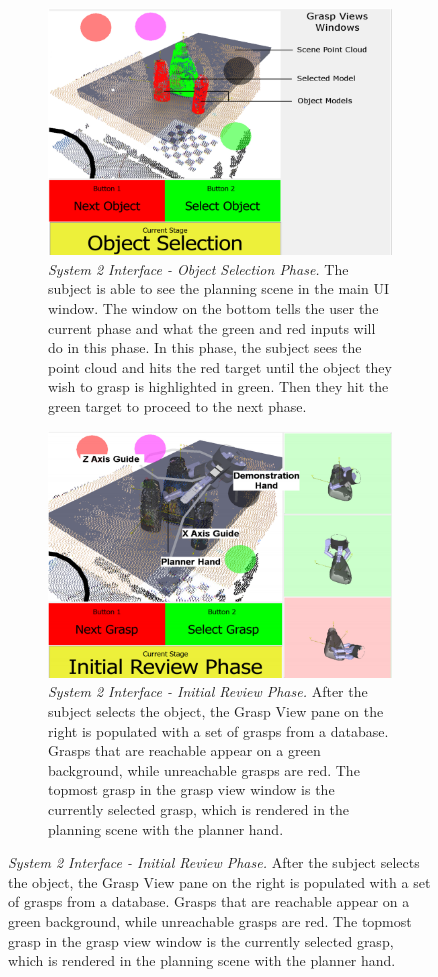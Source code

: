 \begin{figure}
\centering
\begin{subfigure}[t]{\columnwidth}
\centering
\includegraphics[width=.99\columnwidth]{ui_3_a.png}
\caption{\emph{System 2 Interface - Object Selection Phase.} The subject is able to see the planning scene in the main UI window. The window on the bottom tells the user the current phase and what the green and red inputs will do in this phase. In this phase, the subject sees the point cloud and hits the red target until the object they wish to grasp is highlighted in green. Then they hit the green target to proceed to the next phase.}
\label{fig:semg_ui_a}
\end{subfigure}
\begin{subfigure}[t]{\columnwidth}
\centering
\includegraphics[width=.99\columnwidth]{ui_3_b.png}
\caption{\emph{System 2 Interface - Initial Review Phase.} After the subject selects the object, the Grasp View pane on the right is populated with a set of grasps from a database. Grasps that are reachable appear on a green background, while unreachable grasps are red. The topmost grasp in the grasp view window is the currently selected grasp, which is rendered in the planning scene with the planner hand.}
\label{fig:semg_ui_b}
\end{subfigure}
\end{figure}

